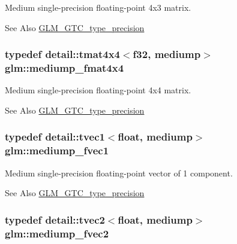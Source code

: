 Medium single-\/precision floating-\/point 4x3 matrix. \begin{DoxySeeAlso}{See Also}
\hyperlink{group__gtc__type__precision}{G\-L\-M\-\_\-\-G\-T\-C\-\_\-type\-\_\-precision} 
\end{DoxySeeAlso}
\hypertarget{group__gtc__type__precision_ga7f4ae9d05ca94005a0b7d8e3c59943cd}{
\subsubsection[{mediump\-\_\-fmat4x4}]{\setlength{\rightskip}{0pt plus 5cm}typedef detail\-::tmat4x4$<$f32, mediump$>$ {\bf glm\-::mediump\-\_\-fmat4x4}}}\label{group__gtc__type__precision_ga7f4ae9d05ca94005a0b7d8e3c59943cd}
Medium single-\/precision floating-\/point 4x4 matrix. \begin{DoxySeeAlso}{See Also}
\hyperlink{group__gtc__type__precision}{G\-L\-M\-\_\-\-G\-T\-C\-\_\-type\-\_\-precision} 
\end{DoxySeeAlso}
\hypertarget{group__gtc__type__precision_ga4534af301d5260974cee29f76842d579}{
\subsubsection[{mediump\-\_\-fvec1}]{\setlength{\rightskip}{0pt plus 5cm}typedef detail\-::tvec1$<$float, mediump$>$ {\bf glm\-::mediump\-\_\-fvec1}}}\label{group__gtc__type__precision_ga4534af301d5260974cee29f76842d579}
Medium single-\/precision floating-\/point vector of 1 component. \begin{DoxySeeAlso}{See Also}
\hyperlink{group__gtc__type__precision}{G\-L\-M\-\_\-\-G\-T\-C\-\_\-type\-\_\-precision} 
\end{DoxySeeAlso}
\hypertarget{group__gtc__type__precision_ga5c2686caa6838515f6727eea1b64aa05}{
\subsubsection[{mediump\-\_\-fvec2}]{\setlength{\rightskip}{0pt plus 5cm}typedef detail\-::tvec2$<$float, mediump$>$ {\bf glm\-::mediump\-\_\-fvec2}}}\label{group__gtc__type__precision_ga5c2686caa6838515f6727eea1b64aa05}
